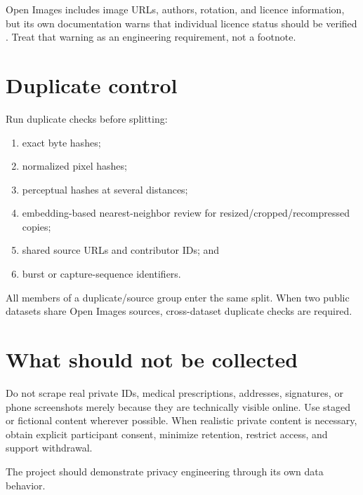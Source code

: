 Open Images includes image URLs, authors, rotation, and licence information, but its own documentation warns that individual licence status should be verified \citep{openimagesv7}. Treat that warning as an engineering requirement, not a footnote.

\section{Duplicate control}

Run duplicate checks before splitting:

\begin{enumerate}[leftmargin=7mm]
  \item exact byte hashes;
  \item normalized pixel hashes;
  \item perceptual hashes at several distances;
  \item embedding-based nearest-neighbor review for resized/cropped/recompressed copies;
  \item shared source URLs and contributor IDs; and
  \item burst or capture-sequence identifiers.
\end{enumerate}

All members of a duplicate/source group enter the same split. When two public datasets share Open Images sources, cross-dataset duplicate checks are required.

\section{What should not be collected}

Do not scrape real private IDs, medical prescriptions, addresses, signatures, or phone screenshots merely because they are technically visible online. Use staged or fictional content wherever possible. When realistic private content is necessary, obtain explicit participant consent, minimize retention, restrict access, and support withdrawal.

The project should demonstrate privacy engineering through its own data behavior.
